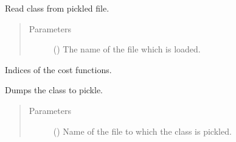 \documentclass[letterpaper,10pt,english]{sphinxmanual}
\begin{document}
\begin{fulllineitems}

\begin{fulllineitems}
\label{\detokenize{qsim:id11}}
Read class from pickled file.
\begin{quote}\begin{description}
\item[{Parameters}] \leavevmode
{} () \textendash{} The name of the file which is loaded.

\end{description}\end{quote}

\end{fulllineitems}


\begin{fulllineitems}
\label{\detokenize{qsim:qsim.data_container.DataContainer.index}}
Indices of the cost functions.

\end{fulllineitems}


\begin{fulllineitems}
\label{\detokenize{qsim:id12}}
Dumps the class to pickle.
\begin{quote}\begin{description}
\item[{Parameters}] \leavevmode
{} () \textendash{} Name of the file to which the class is pickled.

\end{description}\end{quote}

\end{fulllineitems}


\end{fulllineitems}
\end{document}
